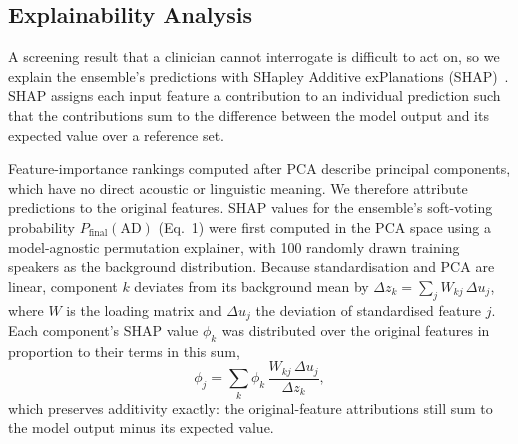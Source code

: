 %


\subsection{Explainability Analysis}

A screening result that a clinician cannot interrogate is difficult to act on, so we explain the ensemble's predictions with SHapley Additive exPlanations (SHAP)~\cite{lundberg2017}. SHAP assigns each input feature a contribution to an individual prediction such that the contributions sum to the difference between the model output and its expected value over a reference set.

Feature-importance rankings computed after PCA describe principal components, which have no direct acoustic or linguistic meaning. We therefore attribute predictions to the original features. SHAP values for the ensemble's soft-voting probability $P_{\text{final}}(\text{AD})$ (Eq.~1) were first computed in the PCA space using a model-agnostic permutation explainer, with 100 randomly drawn training speakers as the background distribution. Because standardisation and PCA are linear, component $k$ deviates from its background mean by $\Delta z_k=\sum_j W_{kj}\,\Delta u_j$, where $W$ is the loading matrix and $\Delta u_j$ the deviation of standardised feature $j$. Each component's SHAP value $\phi_k$ was distributed over the original features in proportion to their terms in this sum,
\begin{equation}
\phi_j=\sum_k \phi_k\,\frac{W_{kj}\,\Delta u_j}{\Delta z_k},
\end{equation}
which preserves additivity exactly: the original-feature attributions still sum to the model output minus its expected value.

